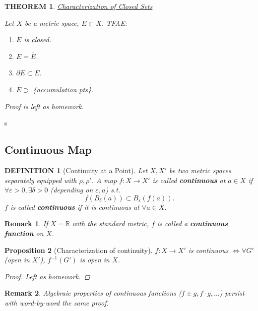 \documentclass[12pt]{article}
\theoremstyle{blueplain}
\newtheorem{theorem}{THEOREM}[section]
\newtheorem{proposition}[theorem]{Proposition}
\theoremstyle{bluedef}
\newtheorem{definition}{DEFINITION}[section]
\theoremstyle{blueremark}
\newtheorem{remark}{Remark}[section]
\newcommand{\R}{\mathbb{R}}
\newcommand{\eps}{\varepsilon}
\numberwithin{equation}{section}
\begin{document}
      \begin{theorem}\underline{Characterization of Closed Sets}

        Let $X$ be a metric space, $E \subset X$. TFAE:
        \begin{enumerate}
          \item $E$ is closed.
          \item $E = \bar{E}$.
          \item $\partial E \subset E$.
          \item $E \supset$ \{accumulation pts\}.
        \end{enumerate}
        Proof is left as homework.
      \end{theorem}s

      \clearpage

      \subsection{Continuous Map}

      \begin{definition}[Continuity at a Point]
        Let $X, X'$ be two metric spaces separately equipped with $\rho, \rho'$. A map $f: X \to X'$ is called \textbf{continuous} at $a \in X$ if $\forall \eps > 0, \exists \delta > 0$ (depending on $\eps, a$) s.t.
        \[ f(B_\delta(a)) \subset B_\eps(f(a)). \]
        $f$ is called \textbf{continuous} if it is continuous at $\forall a \in X$.
      \end{definition}

      \begin{remark}
        If $X = \R$ with the standard metric, $f$ is called a \textbf{continuous function} on $X$.
      \end{remark}

      \begin{proposition}[Characterization of continuity]
        $f: X \to X'$ is continuous $\iff \forall G'$ (open in $X'$), $f^{-1}(G')$ is open in $X$.
        \begin{proof}
          Left as homework.
        \end{proof}
      \end{proposition}

      \begin{remark}
        Algebraic properties of continuous functions ($f \pm g, f \cdot g, \dots$) persist with word-by-word the same proof.
      \end{remark}
\end{document}
